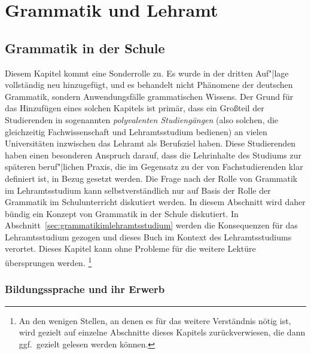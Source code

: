 \chapter{Grammatik und Lehramt}
\label{sec:grammatikundlehramt}


\section{Grammatik in der Schule}
\label{sec:grammatikinderschule}

Diesem Kapitel kommt eine Sonderrolle zu.
Es wurde in der dritten Auf"|lage vollständig neu hinzugefügt, und es behandelt nicht Phänomene der deutschen Grammatik, sondern Anwendungsfälle grammatischen Wissens.
Der Grund für das Hinzufügen eines solchen Kapitels ist primär, dass ein Großteil der Studierenden in sogenannten \textit{polyvalenten Studiengängen} (also solchen, die gleichzeitig Fachwissenschaft und Lehramtsstudium bedienen) an vielen Universitäten inzwischen das Lehramt als Berufsziel haben.
Diese Studierenden haben einen besonderen Anspruch darauf, dass die Lehrinhalte des Studiums zur späteren beruf"|lichen Praxis, die im Gegensatz zu der von Fachstudierenden klar definiert ist, in Bezug gesetzt werden.
Die Frage nach der Rolle von Grammatik im Lehramtsstudium kann selbstverständlich nur auf Basis der Rolle der Grammatik im Schulunterricht diskutiert werden.
In diesem Abschnitt wird daher bündig ein Konzept von Grammatik in der Schule diskutiert.
In Abschnitt~\ref{sec:grammatikimlehramtsstudium} werden die Konsequenzen für das Lehramtsstudium gezogen und dieses Buch im Kontext des Lehramtsstudiums verortet.
Dieses Kapitel kann ohne Probleme für die weitere Lektüre übersprungen werden.%
\footnote{An den wenigen Stellen, an denen es für das weitere Verständnis nötig ist, wird gezielt auf einzelne Abschnitte dieses Kapitels zurückverwiesen, die dann ggf.\ gezielt gelesen werden können.}

\subsection{Bildungssprache und ihr Erwerb}
\label{sec:bildungsspracheundihrerwerb}

